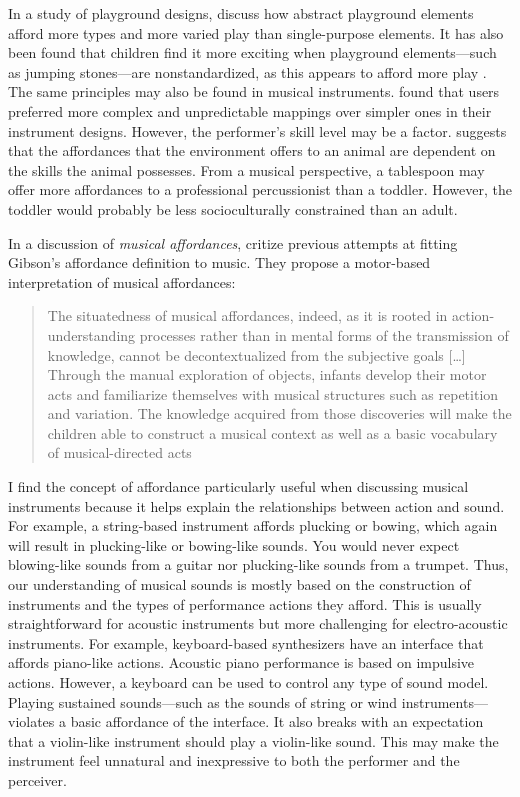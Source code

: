 In a study of playground designs, \citet{withagen_aldo_2017} discuss how abstract playground elements afford more types and more varied play than single-purpose elements. It has also been found that children find it more exciting when playground elements---such as jumping stones---are nonstandardized, as this appears to afford more play \citep{sporrel_gap-crossing_2017}. The same principles may also be found in musical instruments. \citet{hunt_importance_2003} found that users preferred more complex and unpredictable mappings over simpler ones in their instrument designs. However, the performer's skill level may be a factor. \citet{rietveld_rich_2014} suggests that the affordances that the environment offers to an animal are dependent on the skills the animal possesses. From a musical perspective, a tablespoon may offer more affordances to a professional percussionist than a toddler. However, the toddler would probably be less socioculturally constrained than an adult.

In a discussion of \emph{musical affordances}, \citet[p.211]{menin_rethinking_2012} critize previous attempts at fitting Gibson's affordance definition to music. They propose a motor-based interpretation of musical affordances:

\begin{quotation}
The situatedness of musical affordances, indeed, as it is rooted in action-understanding processes rather than in mental forms of the transmission of knowledge, cannot be decontextualized from the subjective goals [\ldots] Through the manual exploration of objects, infants develop their motor acts and familiarize themselves with musical structures such as repetition and variation. The knowledge acquired from those discoveries will make the children able to construct a musical context as well as a basic vocabulary of musical-directed acts
\end{quotation}

I find the concept of affordance particularly useful when discussing musical instruments because it helps explain the relationships between action and sound. For example, a string-based instrument affords plucking or bowing, which again will result in plucking-like or bowing-like sounds. You would never expect blowing-like sounds from a guitar nor plucking-like sounds from a trumpet. Thus, our understanding of musical sounds is mostly based on the construction of instruments and the types of performance actions they afford. This is usually straightforward for acoustic instruments but more challenging for electro-acoustic instruments. For example, keyboard-based synthesizers have an interface that affords piano-like actions. Acoustic piano performance is based on impulsive actions. However, a keyboard can be used to control any type of sound model. Playing sustained sounds---such as the sounds of string or wind instruments---violates a basic affordance of the interface. It also breaks with an expectation that a violin-like instrument should play a violin-like sound. This may make the instrument feel unnatural and inexpressive to both the performer and the perceiver.
